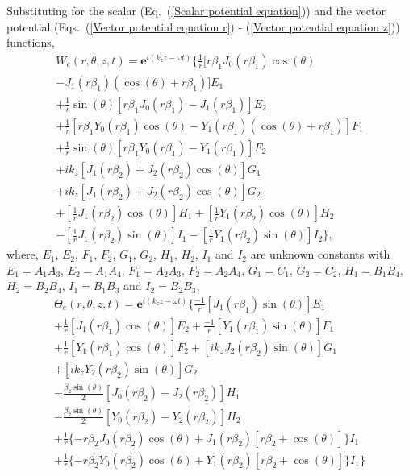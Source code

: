 \documentclass[10pt]{asme2ej}
\begin{document}
Substituting for the scalar (Eq.~(\ref{Scalar potential equation})) and the vector potential (Eqs.~(\ref{Vector potential equation r}) - (\ref{Vector potential equation z})) functions,
\begin{multline}
    W_e(r,\theta,z,t) = \mathbf{e}^{i(k_{z}z-\omega t)}\bigg\{\frac{1}{r}[r\beta_1 J_0(r\beta_1)\cos(\theta)\\ - J_1(r\beta_1)(\cos(\theta) + r\beta_1)]E_1\\ + \frac{1}{r}\sin(\theta)[r\beta_1 J_0(r\beta_1) - J_1(r\beta_1)]E_2\\ + \frac{1}{r}[r\beta_1 Y_0(r\beta_1)\cos(\theta) - Y_1(r\beta_1)(\cos(\theta) + r\beta_1)]F_1\\ + \frac{1}{r}\sin(\theta)[r\beta_1 Y_0(r\beta_1) - Y_1(r\beta_1)]F_2\\ + ik_z[J_1(r\beta_2) + J_2(r\beta_2)\cos(\theta)]G_1\\ + ik_z[J_1(r\beta_2) + J_2(r\beta_2)\cos(\theta)]G_2\\ + [\frac{1}{r}J_1(r\beta_2)\cos(\theta)]H_1 + [\frac{1}{r}Y_1(r\beta_2)\cos(\theta)]H_2\\ - [\frac{1}{r}J_1(r\beta_2)\sin(\theta)]I_1 - [\frac{1}{r}Y_1(r\beta_2)\sin(\theta)]I_2 \bigg\},
\end{multline}
where, $E_1$, $E_2$, $F_1$, $F_2$, $G_1$, $G_2$, $H_1$, $H_2$, $I_1$ and $I_2$ are unknown constants with $E_1 = A_1A_3$, $E_2 = A_1A_4$, $F_1 = A_2A_3$, $F_2 = A_2A_4$, $G_1 = C_1$, $G_2 = C_2$, $H_1 = B_1B_4$, $H_2 = B_2B_4$, $I_1 = B_1B_3$ and $I_2 = B_2B_3$,
\begin{multline}
    \Theta_e(r,\theta,z,t) = \mathbf{e}^{i(k_{z}z-\omega t)}\bigg\{\frac{-1}{r}[J_1(r\beta_1)\sin(\theta)]E_1\\ + \frac{1}{r}[J_1(r\beta_1)\cos(\theta)]E_2 + \frac{-1}{r}[Y_1(r\beta_1)\sin(\theta)]F_1\\ + \frac{1}{r}[Y_1(r\beta_1)\cos(\theta)]F_2 + [ik_zJ_2(r\beta_2)\sin(\theta)]G_1\\ + [ik_zY_2(r\beta_2)\sin(\theta)]G_2\\ - \frac{\beta_2\sin(\theta)}{2}[J_0(r\beta_2)-J_2(r\beta_2)]H_1\\ - \frac{\beta_2\sin(\theta)}{2}[Y_0(r\beta_2)-Y_2(r\beta_2)]H_2\\ + \frac{1}{r}\{-r\beta_2J_0(r\beta_2)\cos(\theta) + J_1(r\beta_2)[r\beta_2+\cos(\theta)]\}I_1\\ + \frac{1}{r}\{-r\beta_2Y_0(r\beta_2)\cos(\theta) + Y_1(r\beta_2)[r\beta_2+\cos(\theta)]\}I_1\bigg\}
\end{multline}
\end{document}
